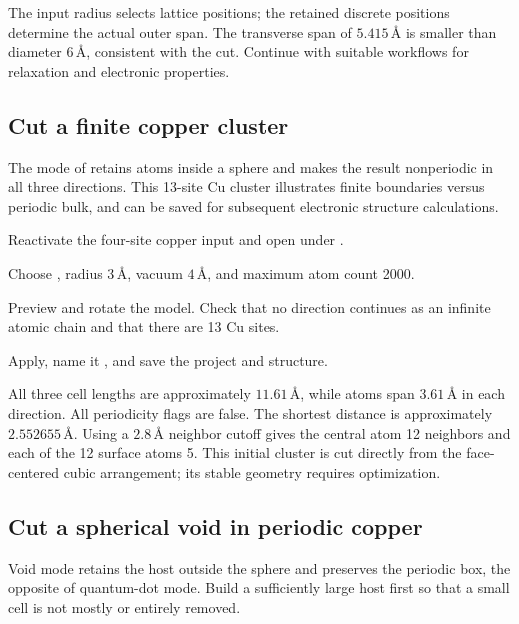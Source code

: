 The input radius selects lattice positions; the retained discrete positions determine the actual outer span. The transverse span of $5.415\,\text{\AA}$ is smaller than diameter $6\,\text{\AA}$, consistent with the cut. Continue with suitable workflows for relaxation and electronic properties.

\subsection{Cut a finite copper cluster}

The  mode of  retains atoms inside a sphere and makes the result nonperiodic in all three directions. This 13-site Cu cluster illustrates finite boundaries versus periodic bulk, and can be saved for subsequent electronic structure calculations.

\begin{steps}
  \item Reactivate the four-site copper input and open  under .
  \item Choose , radius $3\,\text{\AA}$, vacuum $4\,\text{\AA}$, and maximum atom count 2000.
  \item Preview and rotate the model. Check that no direction continues as an infinite atomic chain and that there are 13 Cu sites.
  \item Apply, name it , and save the project and structure.
\end{steps}

All three cell lengths are approximately $11.61\,\text{\AA}$, while atoms span $3.61\,\text{\AA}$ in each direction. All periodicity flags are false. The shortest distance is approximately $2.552655\,\text{\AA}$. Using a $2.8\,\text{\AA}$ neighbor cutoff gives the central atom 12 neighbors and each of the 12 surface atoms 5. This initial cluster is cut directly from the face-centered cubic arrangement; its stable geometry requires optimization.

\subsection{Cut a spherical void in periodic copper}

Void mode retains the host outside the sphere and preserves the periodic box, the opposite of quantum-dot mode. Build a sufficiently large host first so that a small cell is not mostly or entirely removed.

